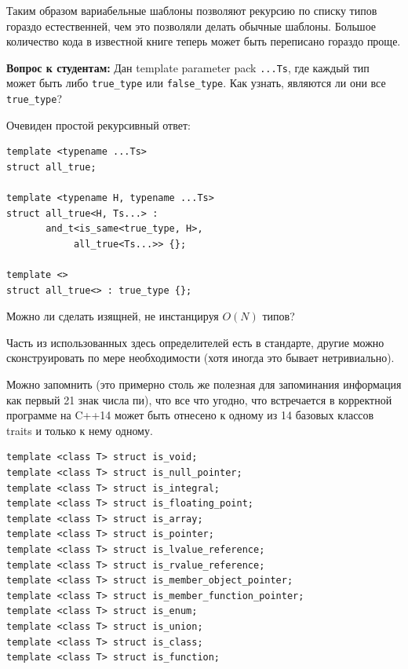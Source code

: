 \documentclass[a4paper,12pt,oneside]{book}
\newif\ifanswers
\begin{document}
Таким образом вариабельные шаблоны позволяют рекурсию по списку типов гораздо естественней, чем это позволяли делать обычные шаблоны. Большое количество кода в известной книге \cite{mcpp} теперь может быть переписано гораздо проще.

\textbf{Вопрос к студентам:} Дан template parameter pack \lstinline!...Ts!, где каждый тип может быть либо \lstinline!true_type! или \lstinline!false_type!. Как узнать, являются ли они все \lstinline!true_type!?

Очевиден простой рекурсивный ответ:

\begin{lstlisting}
template <typename ...Ts>
struct all_true;

template <typename H, typename ...Ts>
struct all_true<H, Ts...> : 
       and_t<is_same<true_type, H>, 
            all_true<Ts...>> {};

template <>
struct all_true<> : true_type {};
\end{lstlisting}

Можно ли сделать изящней, не инстанцируя $O(N)$ типов?

\ifanswers
Более просветляющий ответ использует кортежи:

\begin{lstlisting}
template <typename H, typename ...Ts>
struct all_true<H, Ts...> : 
       and_t<is_same<true_type, H>, 
             is_same<tuple<H,Ts...>,
                     tuple<Ts...,H>>> {};
\end{lstlisting}
\fi

Часть из использованных здесь определителей есть в стандарте, другие можно сконструировать по мере необходимости (хотя иногда это бывает нетривиально).

Можно запомнить (это примерно столь же полезная для запоминания информация как первый 21 знак числа пи), что все что угодно, что встречается в корректной программе на C++14 может быть отнесено к одному из 14 базовых классов traits и только к нему одному. 

\begin{lstlisting}
template <class T> struct is_void;
template <class T> struct is_null_pointer;
template <class T> struct is_integral;
template <class T> struct is_floating_point;
template <class T> struct is_array;
template <class T> struct is_pointer;
template <class T> struct is_lvalue_reference;
template <class T> struct is_rvalue_reference;
template <class T> struct is_member_object_pointer;
template <class T> struct is_member_function_pointer;
template <class T> struct is_enum;
template <class T> struct is_union;
template <class T> struct is_class;
template <class T> struct is_function;
\end{lstlisting}
\end{document}
